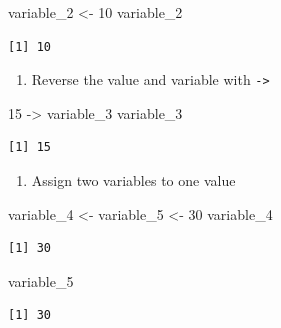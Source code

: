 \documentclass[
  letterpaper,
  DIV=11,
  numbers=noendperiod]{scrreprt}
\newenvironment{Shaded}{\begin{snugshade}}{\end{snugshade}}
\newcommand{\DecValTok}[1]{\textcolor[rgb]{0.68,0.00,0.00}{#1}}
\newcommand{\NormalTok}[1]{\textcolor[rgb]{0.00,0.23,0.31}{#1}}
\newcommand{\OtherTok}[1]{\textcolor[rgb]{0.00,0.23,0.31}{#1}}
\providecommand{\tightlist}{%
  \setlength{\itemsep}{0pt}\setlength{\parskip}{0pt}}\usepackage{longtable,booktabs,array}
\begin{document}
\begin{Shaded}
\begin{Highlighting}[]
\NormalTok{variable\_2 }\OtherTok{\textless{}{-}} \DecValTok{10}
\NormalTok{variable\_2}
\end{Highlighting}
\end{Shaded}

\begin{verbatim}
[1] 10
\end{verbatim}

\begin{enumerate}
\def\labelenumi{\arabic{enumi}.}
\setcounter{enumi}{2}
\tightlist
\item
  Reverse the value and variable with \texttt{-\textgreater{}}
\end{enumerate}

\begin{Shaded}
\begin{Highlighting}[]
\DecValTok{15} \OtherTok{{-}\textgreater{}}\NormalTok{ variable\_3}
\NormalTok{variable\_3}
\end{Highlighting}
\end{Shaded}

\begin{verbatim}
[1] 15
\end{verbatim}

\begin{enumerate}
\def\labelenumi{\arabic{enumi}.}
\setcounter{enumi}{3}
\tightlist
\item
  Assign two variables to one value
\end{enumerate}

\begin{Shaded}
\begin{Highlighting}[]
\NormalTok{variable\_4 }\OtherTok{\textless{}{-}}\NormalTok{ variable\_5 }\OtherTok{\textless{}{-}} \DecValTok{30}
\NormalTok{variable\_4}
\end{Highlighting}
\end{Shaded}

\begin{verbatim}
[1] 30
\end{verbatim}

\begin{Shaded}
\begin{Highlighting}[]
\NormalTok{variable\_5}
\end{Highlighting}
\end{Shaded}

\begin{verbatim}
[1] 30
\end{verbatim}
\end{document}
